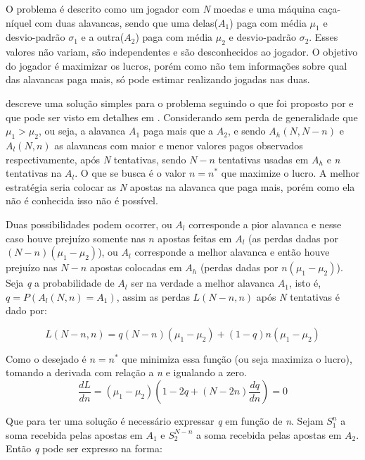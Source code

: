 O problema é descrito como um jogador com \textit{N} moedas e uma máquina caça-níquel com duas alavancas, sendo que uma delas(\(A_1\)) paga com média \(\mu_1\) e desvio-padrão \(\sigma_1\) e a outra(\(A_2\)) paga com média \(\mu_2\) e desvio-padrão \(\sigma_2\). Esses valores não variam, são independentes e são desconhecidos ao jogador. O objetivo do jogador é maximizar os lucros, porém como não tem informações sobre qual das alavancas paga mais, só pode estimar realizando jogadas nas duas. 

\citeauthor{Mitchell1996} descreve uma solução simples para o problema seguindo o que foi proposto por \citeauthor{Holland1992} e que pode ser visto em detalhes em . Considerando sem perda de generalidade que \(\mu_1 > \mu_2\), ou seja, a alavanca \(A_1\) paga mais que a \(A_2\), e sendo \(A_h(N, N-n)\) e \(A_l(N,n)\) as alavancas com maior e menor valores pagos observados respectivamente, após \textit{N} tentativas, sendo \(N-n\) tentativas usadas em \(A_h\) e \textit{n} tentativas na \(A_l\). O que se busca é o valor \(n = n^*\) que maximize o lucro. A melhor estratégia seria colocar as \textit{N} apostas na alavanca que paga mais, porém como ela não é conhecida isso não é possível.

Duas possibilidades podem ocorrer, ou \(A_l\) corresponde a pior alavanca e nesse caso houve prejuízo somente nas \(n\) apostas feitas em \(A_l\) (as perdas dadas por \((N-n)(\mu_1-\mu_2)\)), ou \(A_l\) corresponde a melhor alavanca e então houve prejuízo nas \(N- n\) apostas colocadas em \(A_h\) (perdas dadas por \(n(\mu_1-\mu_2)\)). Seja \textit{q} a probabilidade de \(A_l\) ser na verdade a melhor alavanca \(A_1\), isto é, \(q = P(A_l(N,n) = A_1)\), assim as perdas \(L(N-n,n)\) após \textit{N} tentativas é dado por:

\begin{equation*}
L(N-n,n) = q(N-n)(\mu_1-\mu_2) + (1-q)n(\mu_1-\mu_2)
\end{equation*}

Como o desejado é \(n = n^*\) que minimiza essa função (ou seja maximiza o lucro), tomando a derivada com relação a \textit{n} e igualando a zero.
\begin{equation*}
\frac{dL}{dn} = (\mu_1-\mu_2)\left( 1 - 2q + (N-2n)\frac{dq}{dn}\right) = 0
\end{equation*}

Que para ter uma solução é necessário expressar \textit{q} em função de \textit{n}. Sejam \(S_1^n\) a soma recebida pelas apostas em \(A_1\) e \(S_2^{N-n}\) a soma recebida pelas apostas em \(A_2\). Então \textit{q} pode ser expresso na forma:

